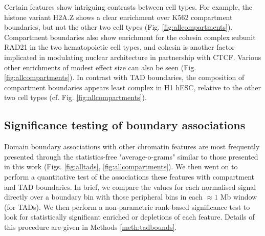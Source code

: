 \documentclass[a4paper,11pt,oneside]{book}
\begin{document}
Certain features show intriguing contrasts between cell types. For example, the
histone variant H2A.Z shows a clear enrichment over K562 compartment boundaries, but not the other two
cell types (Fig. \ref{fig:allcompartments}). Compartment
boundaries also show enrichment for the cohesin complex subunit RAD21
in the two hematopoietic cell types, and cohesin is
another factor implicated in modulating nuclear architecture in
partnership with CTCF.\cite{Zuin2013} Various other enrichments
of modest effect size can also be seen (Fig. \ref{fig:allcompartments}). In contrast with TAD boundaries, the
composition of compartment boundaries appears least complex in H1
hESC, relative to the other two cell types (cf. Fig. \ref{fig:allcompartments}). 

\subsection{Significance testing of boundary associations}\label{sec:boundsignif}

Domain boundary associations with other chromatin features are most frequently presented through the statistics-free "average-o-grams" similar to those presented in this work (Figs. \ref{fig:alltads}, \ref{fig:allcompartments}). We then went on to perform a quantitative test of the associations these features with compartment and TAD boundaries. In brief, we compare the values for each normalised signal directly over a boundary bin with those peripheral bins in each $\approx 1$ Mb window (for TADs). We then perform a non-parametric rank-based significance test to look for statistically significant enriched or depletions of each feature. Details of this procedure are given in Methods \ref{meth:tadbounds}.
\end{document}
